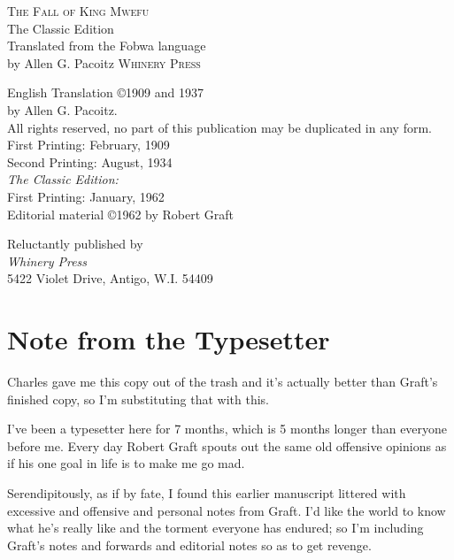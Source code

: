 \frontmatter

\pagestyle{empty}

\begin{center}
\textsc{\LARGE The Fall of King Mwe\-fu}\\
\large The Classic Edition\\[1.5cm]
Translated from the Fo\-bwa language\\ by Allen G. Pa\-co\-itz
\null\vfill
\textsc{Whinery Press}
\end{center}

\break
\null

\break
\null\vfill
{
\small
\noindent
English Translation \copyright 1909 and 1937\\by Allen G. Pa\-co\-itz.\\[0.3cm]
All rights reserved, no part of this publication may be duplicated in any form.\\[1.5cm]

\noindent
First Printing: February, 1909\\
Second Printing: August, 1934\\[0.5cm]

\noindent
\emph{The Classic Edition:} \\
First Printing: January, 1962\\
Editorial material \copyright 1962 by Robert Graft\\[2cm]
}

\noindent
Reluctantly published by\\
\emph{Whinery Press} \\
5422 Violet Drive, Antigo, W.I. 54409

\pagestyle{plain}

\chapter*{Note from the Typesetter}

Charles gave me this copy out of the trash and it's actually better than Graft's finished copy, so I'm substituting that with this.

I've been a typesetter here for 7 months, which is 5 months longer than everyone before me. Every day Robert Graft spouts out the same old offensive opinions as if his one goal in life is to make me go mad.

Serendipitously, as if by fate, I found this earlier manuscript littered with excessive and offensive and personal notes from Graft. I'd like the world to know what he's really like and the torment everyone has endured; so I'm including Graft's notes and forwards and editorial notes so as to get revenge.

